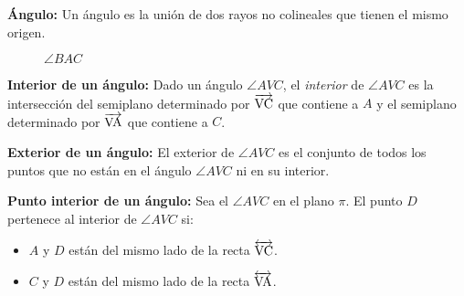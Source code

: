 \begin{definition}{\textbf{Ángulo:}}
Un ángulo es la unión de dos rayos no colineales que tienen el mismo origen.

\begin{figure}[!h]
    \centering
    
    \label{fig:angle}
    \caption{$\angle{BAC}$}
\end{figure}

\end{definition}

\begin{definition}{\textbf{Interior de un ángulo:}}
Dado un ángulo $\angle{AVC}$, el \textit{interior} de $\angle{AVC}$ es la intersección del semiplano determinado por $\overrightarrow{\rm VC}$ que contiene a $A$ y el semiplano determinado por $\overrightarrow{\rm VA}$ que contiene a $C$.

\end{definition}

\begin{definition}{\textbf{Exterior de un ángulo:}}
El exterior de $\angle{AVC}$ es el conjunto de todos los puntos que no están en el ángulo $\angle{AVC}$ ni en su interior.
\end{definition}

\begin{definition}{\textbf{Punto interior de un ángulo:}}
Sea el $\angle{AVC}$ en el plano $\pi$. El punto $D$ pertenece al interior de $\angle{AVC}$ si:

\begin{itemize}
    \item $A$ y $D$ están del mismo lado de la recta $\overleftrightarrow{\rm VC}$.
    \item $C$ y $D$ están del mismo lado de la recta $\overleftrightarrow{\rm VA}$.
\end{itemize}

\begin{figure}[h!]

    \centering

    \begin{subfigure}[b]{.5\textwidth}
        \centering
        
        \label{fig:angle-interior}
    \end{subfigure}%
    \begin{subfigure}[b]{.5\textwidth}
        \centering
        
        \label{fig:angle-exterior}
    \end{subfigure}

    \centering
    \label{fig:angle-int-ext}
    
\end{figure}    


\end{definition}

